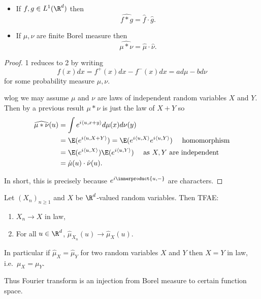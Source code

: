 \documentclass[a4paper]{article}
\newcommand*{\ip}{\innerproduct} %
\begin{document}
\begin{proposition}\leavevmode
  \begin{itemize}
  \item If \(f, g \in L^1(\R^d)\) then
    \[
      \widehat{f * g} = \hat f \cdot \hat g.
    \]
  \item If \(\mu, \nu\) are finite Borel measure then
    \[
      \widehat{\mu * \nu} = \hat \mu \cdot \hat \nu.
    \]
  \end{itemize}
\end{proposition}

\begin{proof}
  1 reduces to 2 by writing
  \[
    f(x) dx = f^+(x) dx - f^-(x) dx = a d\mu - b d\nu
  \]
  for some probability measure \(\mu, \nu\).

  wlog we may assume \(\mu\) and \(\nu\) are laws of independent random variables \(X\) and \(Y\). Then by a previous result \(\mu * \nu\) is just the law of \(X + Y\) so
  \begin{align*}
    \widehat{\mu * \nu}(u)
    &= \int e^{i \langle u, x + y \rangle} d\mu(x) d\nu(y) \\
    &= \E(e^{i \langle u, X + Y \rangle}) = \E(e^{i \langle u, X \rangle} e^{i \langle u, Y \rangle}) \quad \text{ homomorphism} \\
    &= \E(e^{i \langle u, X \rangle}) \E(e^{i \langle u, Y \rangle}) \quad \text{ as \(X, Y\) are independent} \\
    &= \hat \mu(u) \cdot \hat \nu(u).
  \end{align*}

  In short, this is precisely because \(e^{i \ip{u, -}}\) are characters.
\end{proof}

\begin{theorem}
  Let \((X_n)_{n \geq 1}\) and \(X\) be \(\R^d\)-valued random variables. Then TFAE:
  \begin{enumerate}
  \item \(X_n \to X\) in law,
  \item For all \(u \in \R^d\), \(\hat \mu_{X_n}(u) \to \hat \mu_X(u)\).
  \end{enumerate}
  In particular if \(\hat \mu_X = \hat \mu_Y\) for two random variables \(X\) and \(Y\) then \(X = Y\) in law, i.e.\ \(\mu_X = \mu_Y\).
\end{theorem}

Thus Fourier transform is an injection from Borel measure to certain function space.
\end{document}

